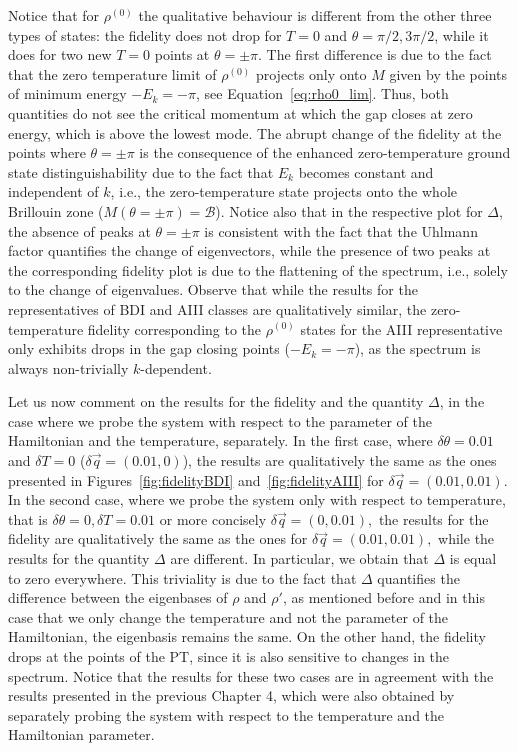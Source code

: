  Notice that for $\rho^{(0)}$ the qualitative behaviour is different from the other three types of states: the fidelity does not drop for $T=0$ and $\theta = \pi /2, 3\pi /2$, while it does for two new $T=0$ points at $\theta = \pm\pi$. The first difference is due to the fact that the zero temperature limit of $\rho^{(0)}$ projects only onto $M$ given by the points of minimum energy $-E_k=-\pi$, see Equation~\eqref{eq:rho0_lim}. Thus, both quantities do not see the critical momentum at which the gap closes at zero energy, which is above the lowest mode. The abrupt change of the fidelity at the points where $\theta=\pm \pi$ is the consequence of the enhanced zero-temperature ground state distinguishability due to the fact that $E_k$ becomes constant and independent of $k$, i.e.,  the zero-temperature state projects onto the whole Brillouin zone ($M(\theta = \pm\pi) = \mathcal B$). Notice also that in the respective plot for $\Delta$, the absence of peaks at $\theta = \pm\pi$ is consistent with the fact that the Uhlmann factor quantifies the change of eigenvectors, while the presence of two peaks at the corresponding fidelity plot is due to the flattening of the spectrum, i.e., solely to the change of eigenvalues. Observe that while the results for the representatives of BDI and AIII classes are qualitatively similar, the zero-temperature fidelity corresponding to the $\rho^{(0)}$ states for the AIII representative only exhibits drops in the gap closing points ($-E_k=-\pi$), as the spectrum is always non-trivially $k$-dependent.
 
Let us now comment on the results for the fidelity and the quantity $\Delta$, in the case where we probe the system with respect to the parameter of the Hamiltonian and the temperature, separately. In the first case, where $\delta\theta=0.01$ and $\delta T=0$ ($\delta\vec{q}=(0.01,0)$), the results are qualitatively the same as the ones presented in Figures~\ref{fig:fidelityBDI} and~\ref{fig:fidelityAIII} for $\delta\vec{q}=(0.01,0.01).$ In the second case, where we probe the system only with respect to temperature, that is $\delta\theta=0, \delta T=0.01$ or more concisely $\delta\vec{q}=(0,0.01),$ the results for the fidelity are qualitatively the same as the ones for $\delta\vec{q}=(0.01,0.01),$ while the results for the quantity $\Delta$ are different. In particular, we obtain that $\Delta$ is equal to zero everywhere. This triviality is due to the fact that $\Delta$ quantifies the difference between the eigenbases of $\rho$ and $\rho'$, as mentioned before and in this case that we only change the temperature and not the parameter of the Hamiltonian, the eigenbasis remains the same. On the other hand, the fidelity drops at the points of the PT, since it is also sensitive to changes in the spectrum. Notice that the results for these two cases are in agreement with the results presented in the previous Chapter 4, which were also obtained by separately probing the system with respect to the temperature and the Hamiltonian parameter.

